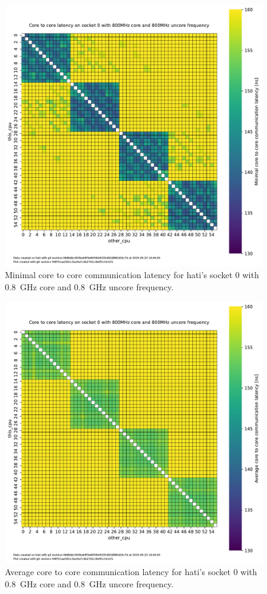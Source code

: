 \begin{figure}[]
    \centering
    \includegraphics[width=\columnwidth]{fig/core-to-core-latency/core-to-core-heatmap-min-800-800.pdf}
    \caption{Minimal core to core communication latency for hati's socket 0 with \SI{0.8}{\GHz} core and \SI{0.8}{\GHz} uncore frequency.}
\end{figure}
\begin{figure}[]
    \centering
    \includegraphics[width=\columnwidth]{fig/core-to-core-latency/core-to-core-heatmap-avg-800-800.pdf}
    \caption{Average core to core communication latency for hati's socket 0 with \SI{0.8}{\GHz} core and \SI{0.8}{\GHz} uncore frequency.}
\end{figure}
